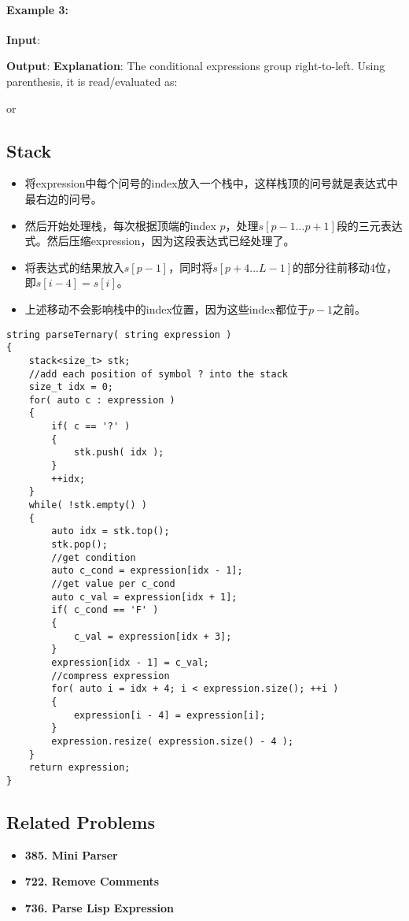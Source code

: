 \paragraph{Example 3:}

\begin{flushleft}
\textbf{Input}: 

\textbf{Output}: 
\textbf{Explanation}: The conditional expressions group right-to-left. Using parenthesis, it is read/evaluated as:


or

\end{flushleft}

\subsection{Stack}
\begin{itemize}
\item 将expression中每个问号的index放入一个栈中，这样栈顶的问号就是表达式中最右边的问号。
\item 然后开始处理栈，每次根据顶端的index $p$，处理$s[p-1...p+1]$段的三元表达式。然后压缩expression，因为这段表达式已经处理了。
\item 将表达式的结果放入$s[p-1]$，同时将$s[p+4...L-1]$的部分往前移动4位，即$s[i-4]=s[i]$。
\item 上述移动不会影响栈中的index位置，因为这些index都位于$p-1$之前。
\end{itemize}

\setcounter{lstlisting}{0}
\begin{lstlisting}[style=customc, caption={Stack}]
string parseTernary( string expression )
{
    stack<size_t> stk;
    //add each position of symbol ? into the stack
    size_t idx = 0;
    for( auto c : expression )
    {
        if( c == '?' )
        {
            stk.push( idx );
        }
        ++idx;
    }
    while( !stk.empty() )
    {
        auto idx = stk.top();
        stk.pop();
        //get condition
        auto c_cond = expression[idx - 1];
        //get value per c_cond
        auto c_val = expression[idx + 1];
        if( c_cond == 'F' )
        {
            c_val = expression[idx + 3];
        }
        expression[idx - 1] = c_val;
        //compress expression
        for( auto i = idx + 4; i < expression.size(); ++i )
        {
            expression[i - 4] = expression[i];
        }
        expression.resize( expression.size() - 4 );
    }
    return expression;
}
\end{lstlisting}

\subsection{Related Problems}
\begin{itemize}
\item \textbf{385. Mini Parser}
\item \textbf{722. Remove Comments}
\item \textbf{736. Parse Lisp Expression}
\end{itemize}